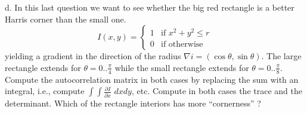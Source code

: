 \documentclass[11pt,english]{article}
\begin{document}
\begin{enumerate}
d. In this last question we want to see whether the big red rectangle is a better Harris corner than the small one. 
\[
I(x,y) = \left\{
	\begin{array}{ll}
		1  & \mbox{if } x^2+y^2  \leq r\\
		0 & \mbox{if } \mbox{otherwise}
	\end{array}
\right.
\]
yielding a  gradient in the direction of the radius $\nabla i = (\cos\theta,\sin\theta)$.
The large rectangle extends for $\theta=0..\frac{\pi}{4}$ while the small rectangle extends for  $\theta=0..\frac{\pi}{8}$. Compute the autocorrelation matrix in both cases by replacing the sum with an integral, i.e., compute $\int\int \frac{\partial{I}}{\partial{x}}\,\,dxdy$, etc. Compute in both cases the trace and the determinant. Which of the rectangle interiors has more ``cornerness'' ?



\end{enumerate}
\end{document}
